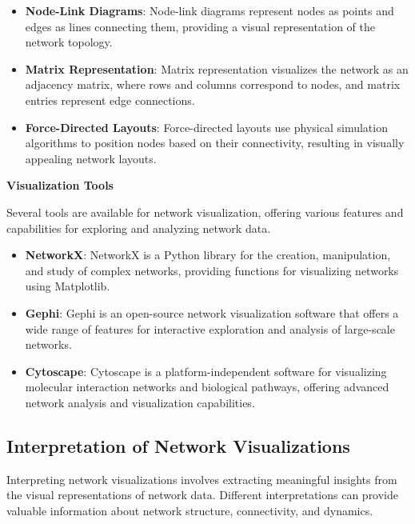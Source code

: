 \documentclass[12pt]{book} %
\begin{document}
\begin{itemize}
    \item \textbf{Node-Link Diagrams}: Node-link diagrams represent nodes as points and edges as lines connecting them, providing a visual representation of the network topology.
    
    \item \textbf{Matrix Representation}: Matrix representation visualizes the network as an adjacency matrix, where rows and columns correspond to nodes, and matrix entries represent edge connections.
    
    \item \textbf{Force-Directed Layouts}: Force-directed layouts use physical simulation algorithms to position nodes based on their connectivity, resulting in visually appealing network layouts.
\end{itemize}

\textbf{Visualization Tools}

Several tools are available for network visualization, offering various features and capabilities for exploring and analyzing network data.

\begin{itemize}
    \item \textbf{NetworkX}: NetworkX is a Python library for the creation, manipulation, and study of complex networks, providing functions for visualizing networks using Matplotlib.
    
    \item \textbf{Gephi}: Gephi is an open-source network visualization software that offers a wide range of features for interactive exploration and analysis of large-scale networks.
    
    \item \textbf{Cytoscape}: Cytoscape is a platform-independent software for visualizing molecular interaction networks and biological pathways, offering advanced network analysis and visualization capabilities.
\end{itemize}

\subsection{Interpretation of Network Visualizations}

Interpreting network visualizations involves extracting meaningful insights from the visual representations of network data. Different interpretations can provide valuable information about network structure, connectivity, and dynamics.
\end{document}
